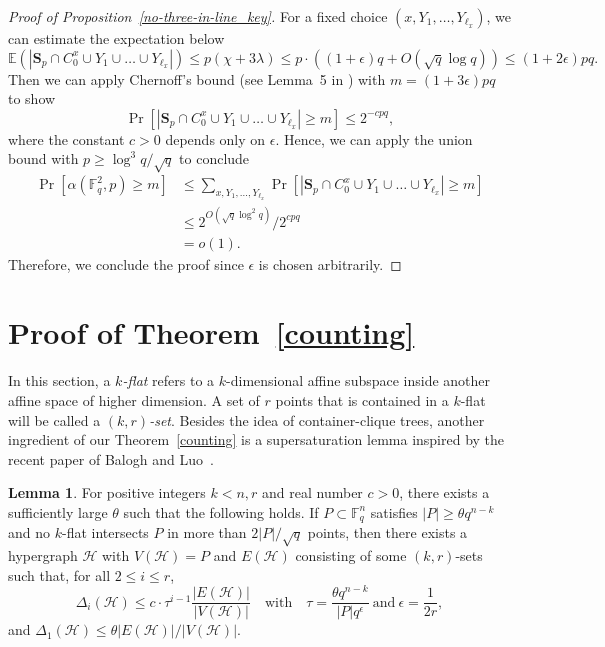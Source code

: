 \documentclass[11pt]{article}
\theoremstyle{definition}
\newtheorem{lemma}[theorem]{Lemma}
\begin{document}
\begin{proof}[Proof of Proposition~\ref{no-three-in-line_key}]
    For a fixed choice $(x,Y_1,\dots,Y_{\ell_x})$, we can estimate the expectation below \begin{equation*}
        \mathbb{E}(|\mathbf{S}_p \cap C^x_0\cup Y_1\cup \dots\cup Y_{\ell_x}|) \leq p(\chi+3\lambda)\le p\cdot \left((1+\epsilon)q+O(\sqrt{q}\log q)\right)\le (1+2\epsilon)pq.
    \end{equation*} Then we can apply Chernoff's bound (see Lemma~5 in \cite{balogh2025maximum}) with $m = (1+3\epsilon)pq$ to show \begin{equation*}
        \Pr[|\mathbf{S}_p \cap C^x_0\cup Y_1\cup \dots\cup Y_{\ell_x}| \geq m] \leq 2^{-cpq},
    \end{equation*} where the constant $c > 0$ depends only on $\epsilon$. Hence, we can apply the union bound with $p \geq \log^3 q /\sqrt{q}$ to conclude \begin{align*}
        \Pr[\alpha(\mathbb{F}^2_q,p)\geq m] &\leq \sum_{x,Y_1,\dots,Y_{\ell_x}}\Pr[|\mathbf{S}_p \cap C^x_0\cup Y_1\cup \dots\cup Y_{\ell_x}| \geq m]\\
        &\leq 2^{O\left(\sqrt{q}\log^2 q\right)}/2^{cpq}\\
        &= o(1).
    \end{align*} Therefore, we conclude the proof since $\epsilon$ is chosen arbitrarily.
\end{proof}

\section{Proof of Theorem~\ref{counting}}\label{sec:counting}

In this section, a \textit{$k$-flat} refers to a $k$-dimensional affine subspace inside another affine space of higher dimension. A set of $r$ points that is contained in a $k$-flat will be called a \textit{$(k,r)$-set}. Besides the idea of container-clique trees, another ingredient of our Theorem~\ref{counting} is a supersaturation lemma inspired by the recent paper of Balogh and Luo~\cite{balogh2025maximum}.

\begin{lemma}\label{counting_supersaturation}
    For positive integers $k < n, r$ and real number $c > 0$, there exists a sufficiently large $\theta$ such that the following holds. If $P \subset \mathbb{F}_q^{n}$ satisfies $ |P| \geq \theta q^{n-k}$ and no $k$-flat intersects $P$ in more than $2|P|/\sqrt{q}$ points, then there exists a hypergraph $\mathcal{H}$ with $V(\mathcal{H}) = P$ and $E(\mathcal{H})$ consisting of some $(k,r)$-sets such that, for all $2\leq i\leq r$, \begin{equation*}
        \Delta_i(\mathcal{H}) \leq c \cdot \tau^{i-1} \frac{|E(\mathcal{H})|}{|V(\mathcal{H})|} \quad\text{with}\quad \tau = \frac{\theta q^{n-k}}{|P|q^\epsilon} ~\text{and}~ \epsilon = \frac{1}{2r},
    \end{equation*} and $\Delta_1(\mathcal{H})\leq \theta |E(\mathcal{H})|/|V(\mathcal{H})|$.
\end{lemma}
\end{document}
